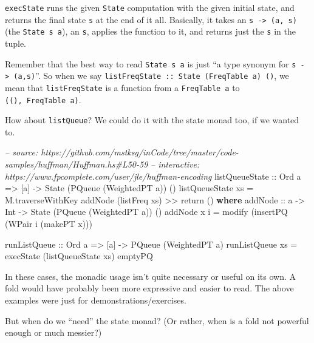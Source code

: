 \documentclass[]{article}
\newenvironment{Shaded}{}{}
\newcommand{\KeywordTok}[1]{\textcolor[rgb]{0.00,0.44,0.13}{\textbf{{#1}}}}
\newcommand{\DataTypeTok}[1]{\textcolor[rgb]{0.56,0.13,0.00}{{#1}}}
\newcommand{\CommentTok}[1]{\textcolor[rgb]{0.38,0.63,0.69}{\textit{{#1}}}}
\newcommand{\OtherTok}[1]{\textcolor[rgb]{0.00,0.44,0.13}{{#1}}}
\newcommand{\FunctionTok}[1]{\textcolor[rgb]{0.02,0.16,0.49}{{#1}}}
\newcommand{\NormalTok}[1]{{#1}}
\begin{document}
\texttt{execState} runs the given \texttt{State} computation with the
given initial state, and returns the final state \texttt{s} at the end
of it all. Basically, it takes an \texttt{s\ -\textgreater{}\ (a,\ s)}
(the \texttt{State\ s\ a}), an \texttt{s}, applies the function to it,
and returns just the \texttt{s} in the tuple.

Remember that the best way to read \texttt{State\ s\ a} is just ``a type
synonym for \texttt{s\ -\textgreater{}\ (a,s)}''. So when we say
\texttt{listFreqState\ ::\ State\ (FreqTable\ a)\ ()}, we mean that
\texttt{listFreqState} is a function from a \texttt{FreqTable\ a} to
\texttt{((),\ FreqTable\ a)}.

How about \texttt{listQueue}? We could do it with the state monad too,
if we wanted to.

\begin{Shaded}
\begin{Highlighting}[]
\CommentTok{-- source: https://github.com/mstksg/inCode/tree/master/code-samples/huffman/Huffman.hs#L50-59}
\CommentTok{-- interactive: https://www.fpcomplete.com/user/jle/huffman-encoding}
\OtherTok{listQueueState ::} \DataTypeTok{Ord} \NormalTok{a }\OtherTok{=>} \NormalTok{[a] }\OtherTok{->} \DataTypeTok{State} \NormalTok{(}\DataTypeTok{PQueue} \NormalTok{(}\DataTypeTok{WeightedPT} \NormalTok{a)) ()}
\NormalTok{listQueueState xs }\FunctionTok{=} \NormalTok{M.traverseWithKey addNode (listFreq xs) }\FunctionTok{>>} \NormalTok{return ()}
  \KeywordTok{where}
\OtherTok{    addNode ::} \NormalTok{a }\OtherTok{->} \DataTypeTok{Int} \OtherTok{->} \DataTypeTok{State} \NormalTok{(}\DataTypeTok{PQueue} \NormalTok{(}\DataTypeTok{WeightedPT} \NormalTok{a)) ()}
    \NormalTok{addNode x i }\FunctionTok{=} \NormalTok{modify (insertPQ (}\DataTypeTok{WPair} \NormalTok{i (makePT x)))}

\OtherTok{runListQueue ::} \DataTypeTok{Ord} \NormalTok{a }\OtherTok{=>} \NormalTok{[a] }\OtherTok{->} \DataTypeTok{PQueue} \NormalTok{(}\DataTypeTok{WeightedPT} \NormalTok{a)}
\NormalTok{runListQueue xs }\FunctionTok{=} \NormalTok{execState (listQueueState xs) emptyPQ}
\end{Highlighting}
\end{Shaded}

In these cases, the monadic usage isn't quite necessary or useful on its
own. A fold would have probably been more expressive and easier to read.
The above examples were just for demonstrations/exercises.

But when do we ``need'' the state monad? (Or rather, when is a fold not
powerful enough or much messier?)
\end{document}
